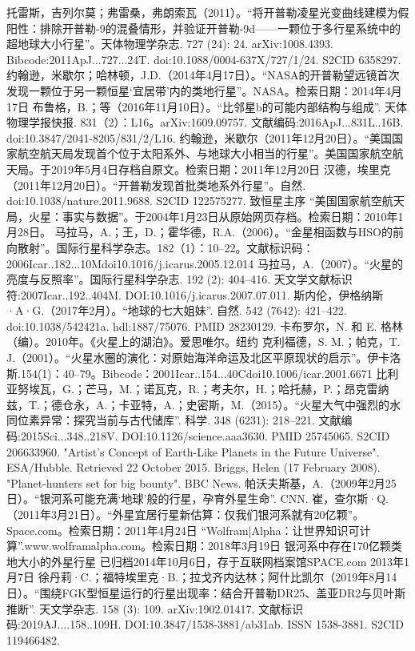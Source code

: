 \begin{enumerate}
 托雷斯，吉列尔莫；弗雷桑，弗朗索瓦（2011）。“将开普勒凌星光变曲线建模为假阳性：排除开普勒-9的混叠情形，并验证开普勒-9d——一颗位于多行星系统中的超地球大小行星”。天体物理学杂志. 727 (24): 24. arXiv:1008.4393. Bibcode:2011ApJ...727...24T. doi:10.1088/0004-637X/727/1/24. S2CID 6358297.
 约翰逊，米歇尔；哈林顿，J.D.（2014年4月17日）。“NASA的开普勒望远镜首次发现一颗位于另一颗恒星‘宜居带’内的类地行星”。NASA。检索日期：2014年4月17日
 布鲁格，B.；等（2016年11月10日）。“比邻星b的可能内部结构与组成”. 天体物理学报快报. 831（2）：L16。arXiv:1609.09757. 文献编码:2016ApJ...831L..16B. doi:10.3847/2041-8205/831/2/L16.
 约翰逊，米歇尔（2011年12月20日）。“美国国家航空航天局发现首个位于太阳系外、与地球大小相当的行星”。美国国家航空航天局。于2019年5月4日存档自原文。检索日期：2011年12月20日
 汉德，埃里克（2011年12月20日）。“开普勒发现首批类地系外行星”。自然. doi:10.1038/nature.2011.9688. S2CID 122575277.
 致恒星主序
 “美国国家航空航天局，火星：事实与数据”。于2004年1月23日从原始网页存档。检索日期：2010年1月28日。
 马拉马，A.；王，D.；霍华德，R.A.（2006）。“金星相函数与HSO的前向散射”。国际行星科学杂志。182（1）：10–22。文献标识码：2006Icar..182...10Mdoi10.1016/j.icarus.2005.12.014
 马拉马，A.（2007）。“火星的亮度与反照率”。国际行星科学杂志. 192 (2): 404–416. 天文学文献标识符:2007Icar..192..404M. DOI:10.1016/j.icarus.2007.07.011.
 斯内伦，伊格纳斯·A·G.（2017年2月）。“地球的七大姐妹”. 自然. 542 (7642): 421–422. doi:10.1038/542421a. hdl:1887/75076. PMID 28230129.
 卡布罗尔，N. 和 E. 格林（编）。2010年。《火星上的湖泊》。爱思唯尔。纽约
 克利福德，S. M.；帕克，T. J.（2001）。“火星水圈的演化：对原始海洋命运及北区平原现状的启示”。伊卡洛斯.154(1)：40–79。Bibcode：2001Icar..154...40Cdoi10.1006/icar.2001.6671
 比利亚努埃瓦，G.；芒马，M.；诺瓦克，R.；考夫尔，H.；哈托赫，P.；昂克雷纳兹，T.；德仓永，A.；卡亚特，A.；史密斯，M.（2015）。“火星大气中强烈的水同位素异常：探究当前与古代储库”. 科学. 348 (6231): 218–221. 文献编码:2015Sci...348..218V. DOI:10.1126/science.aaa3630. PMID 25745065. S2CID 206633960.
 "Artist's Concept of Earth-Like Planets in the Future Universe". ESA/Hubble. Retrieved 22 October 2015.
 Briggs, Helen (17 February 2008). "Planet-hunters set for big bounty". BBC News.
 帕沃夫斯基，A.（2009年2月25日）。“银河系可能充满‘地球’般的行星，孕育外星生命”. CNN.
 崔，查尔斯·Q.（2011年3月21日）。“外星宜居行星新估算：仅我们银河系就有20亿颗”。Space.com。检索日期：2011年4月24日
 “Wolfram|Alpha：让世界知识可计算”.www.wolframalpha.com。检索日期：2018年3月19日
 银河系中存在170亿颗类地大小的外星行星 已归档2014年10月6日，存于互联网档案馆SPACE.com 2013年1月7日
 徐丹莉·C.；福特埃里克·B.；拉戈齐内达林；阿什比凯尔（2019年8月14日）。“围绕FGK型恒星运行的行星出现率：结合开普勒DR25、盖亚DR2与贝叶斯推断”. 天文学杂志. 158 (3): 109. arXiv:1902.01417. 文献标识码:2019AJ....158..109H. DOI:10.3847/1538-3881/ab31ab. ISSN 1538-3881. S2CID 119466482.

\end{enumerate}
